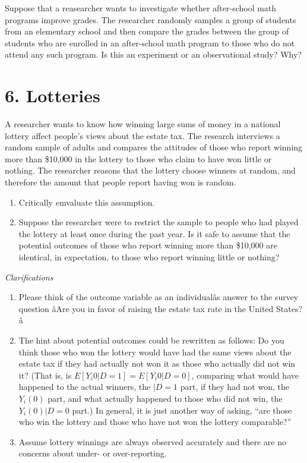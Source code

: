 \documentclass[]{article}
\providecommand{\tightlist}{%
  \setlength{\itemsep}{0pt}\setlength{\parskip}{0pt}}
\begin{document}
Suppose that a reasearcher wants to investigate whether after-school
math programs improve grades. The researcher randomly samples a group of
students from an elementary school and then compare the grades between
the group of students who are enrolled in an after-school math program
to those who do not attend any such program. Is this an experiment or an
observational study? Why?

\hypertarget{lotteries}{%
\section{6. Lotteries}\label{lotteries}}

A researcher wants to know how winning large sums of money in a national
lottery affect people's views about the estate tax. The research
interviews a random sample of adults and compares the attitudes of those
who report winning more than \$10,000 in the lottery to those who claim
to have won little or nothing. The researcher reasons that the lottery
choose winners at random, and therefore the amount that people report
having won is random.

\begin{enumerate}
\def\labelenumi{\alph{enumi}.}
\tightlist
\item
  Critically emvaluate this assumption.
\item
  Suppose the researcher were to restrict the sample to people who had
  played the lottery at least once during the past year. Is it safe to
  assume that the potential outcomes of those who report winning more
  than \$10,000 are identical, in expectation, to those who report
  winning little or nothing?
\end{enumerate}

\emph{Clarifications}

\begin{enumerate}
\def\labelenumi{\arabic{enumi}.}
\tightlist
\item
  Please think of the outcome variable as an individualâs answer to
  the survey question âAre you in favor of raising the estate tax rate
  in the United States?â
\item
  The hint about potential outcomes could be rewritten as follows: Do
  you think those who won the lottery would have had the same views
  about the estate tax if they had actually not won it as those who
  actually did not win it? (That is, is
  \(E[Y_{i}0|D=1] = E[Y_{i}0|D=0]\), comparing what would have happened
  to the actual winners, the \(|D=1\) part, if they had not won, the
  \(Y_{i}(0)\) part, and what actually happened to those who did not
  win, the \(Y_{i}(0)|D=0\) part.) In general, it is just another way of
  asking, ``are those who win the lottery and those who have not won the
  lottery comparable?''
\item
  Assume lottery winnings are always observed accurately and there are
  no concerns about under- or over-reporting.
\end{enumerate}
\end{document}
